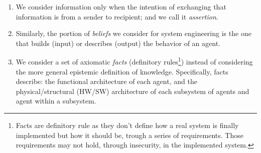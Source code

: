 \documentclass[conference]{IEEEtran}
\begin{document}
\begin{enumerate}
	\item We consider information only when the intention of exchanging 
		that information is from a sender to 
		recipient; and we call it \emph{assertion}.
	\item Similarly, the portion of \emph{beliefs} we consider for system
		engineering is the one that builds (input) or describes
		(output) the behavior of an agent.
	\item We consider a set of axiomatic \emph{facts} 
		(definitory
		rules\footnote{Facts are definitory rule as they don't
		define how a real system is finally implemented but
		how it should be, trough a series of requirements. Those requirements 
		may not hold, through insecurity, in the implemented system.}\autocite{Hintikka1993Information})
		instead of considering the more general epistemic definition of
		knowledge. Specifically, facts describe: the functional
		architecture of each agent, and the physical/structural (HW/SW)
		architecture of each subsystem of agents and agent within a
		subsystem.
\end{enumerate}
\end{document}

